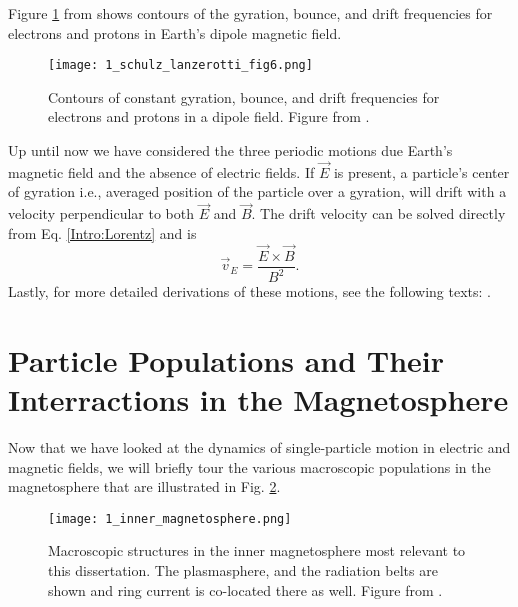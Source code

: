 Figure \ref{Intro:adiabatic_frequencies} from \citet{Schulz1974} shows contours of the gyration, bounce, and drift frequencies for electrons and protons in Earth's dipole magnetic field. 

\begin{figure}
\texttt{[image: 1\_schulz\_lanzerotti\_fig6.png]}
\caption{Contours of constant gyration, bounce, and drift frequencies for electrons and protons in a dipole field. Figure from \citet{Schulz1974}.}
\label{Intro:adiabatic_frequencies}
\end{figure}

Up until now we have considered the three periodic motions due Earth's magnetic field and the absence of electric fields. If $\vec{E}$ is present, a particle's center of gyration i.e., averaged position of the particle over a gyration, will drift with a velocity perpendicular to both $\vec{E}$ and $\vec{B}$. The drift velocity can be solved directly from Eq. \ref{Intro:Lorentz} and is
\begin{equation}
\vec{v}_E = \frac{\vec{E} \times \vec{B}}{B^2}.
\end{equation} Lastly, for more detailed derivations of these motions, see the following texts: \citet{Baumjohann1997, Schulz1974, Tsurutani1997}.
        
\section{Particle Populations and Their Interractions in the Magnetosphere}\label{ntro:particle_populations}
Now that we have looked at the dynamics of single-particle motion in electric and magnetic fields, we will briefly tour the various macroscopic populations in the magnetosphere that are illustrated in Fig. \ref{Intro:inner_magnetosphere}.

\begin{figure}
\texttt{[image: 1\_inner\_magnetosphere.png]}
\caption{Macroscopic structures in the inner magnetosphere most relevant to this dissertation. The plasmasphere, and the radiation belts are shown and ring current is co-located there as well. Figure from \citet{Baumjohann1997}.}
\label{Intro:inner_magnetosphere}
\end{figure}

